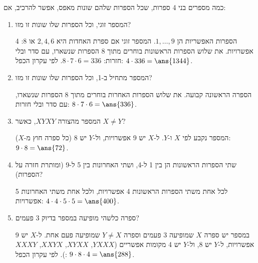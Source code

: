 כמה מספרים בני 4 ספרות, שכל הספרות שלהם שונות מאפס, אפשר להרכיב, אם:
\begin{enumerate}
\item המספר זוגי, וכל הספרות שלו שונות זו מזו?
\begin{solbox}
הספרות האפשריות הן $1,\dots,9$. המספר זוגי אם ספרת האחדות היא $2,4,6$ או $8$: 4 אפשרויות. את שלוש הספרות הראשונות בוחרים מתוך 8 הספרות שנשארו, עם סדר ובלי חזרות: $8\cdot7\cdot6=336$. לפי עקרון הכפל: $4\cdot336=\ans{1344}$.
\end{solbox}
\item המספר מתחיל ב-1, וכל הספרות שלו שונות זו מזו?
\begin{solbox}
הספרה הראשונה קבועה. את שלוש הספרות האחרות בוחרים מתוך 8 הספרות שנשארו, עם סדר ובלי חזרות: $8\cdot7\cdot6=\ans{336}$.
\end{solbox}
\item המספר מהצורה $XYXY$, כאשר $X\neq Y$?
\begin{solbox}
המספר נקבע לפי $X$ ו-$Y$. ל-$X$ יש 9 אפשרויות, ול-$Y$ יש 8 (כל ספרה חוץ מ-$X$): $9\cdot8=\ans{72}$.
\end{solbox}
\item שתי הספרות הראשונות הן בין 1 ל-4, ושתי האחרונות בין 5 ל-9 (ומותרת חזרה על הספרות)?
\begin{solbox}
לכל אחת משתי הספרות הראשונות 4 אפשרויות, ולכל אחת משתי האחרונות 5 אפשרויות: $4\cdot4\cdot5\cdot5=\ans{400}$.
\end{solbox}
\item ספרה כלשהי מופיעה במספר בדיוק 3 פעמים?
\begin{solbox}
במספר יש ספרה $X$ שמופיעה 3 פעמים וספרה $Y\neq X$ שמופיעה פעם אחת. ל-$X$ יש 9 אפשרויות, ל-$Y$ יש 8, ול-$Y$ יש 4 מקומות אפשריים ($YXXX$, $XYXX$, $XXYX$, $XXXY$). לפי עקרון הכפל: $9\cdot8\cdot4=\ans{288}$.
\end{solbox}
\end{enumerate}
